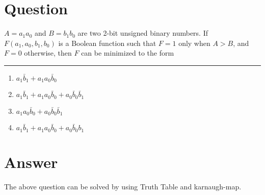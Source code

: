 \documentclass[journal,12pt,twocolumn]{IEEEtran}
\title{\mytitle}
\author{\myauthor\hspace{1em}\\\contact\\IITH\hspace{0.5em}-\hspace{0.6em}\mymodule}
\date{20-12-2022}
\begin{document}
%

\theoremstyle{definition}
\newtheorem{theorem}{Theorem}[section]
\newtheorem{problem}{Problem}
\newtheorem{proposition}{Proposition}[section]
\newtheorem{lemma}{Lemma}[section]
\newtheorem{corollary}[theorem]{Corollary}
\newtheorem{example}{Example}[section]
\newtheorem{definition}{Definition}[section]
\newcommand{\BEQA}{\begin{eqnarray}}
\newcommand{\EEQA}{\end{eqnarray}}
\newcommand{\define}{\stackrel{\triangle}{=}}


\vspace{3cm}
\maketitle
\tableofcontents



\section{\textbf{Question}}
$A=a_1a_0$ and $B=b_1b_0$ are two 2-bit unsigned binary numbers. If $F(a_1,a_0,b_1,b_0)$ is a Boolean function such that $F = 1$ only when $A>B$, and $F=0$ otherwise, then $F$ can be minimized to the form \rule{9mm}{0.4pt}
\begin{enumerate}[label=(\Alph*)]
	\item $a_1\bar b_1+a_1a_0\bar b_0$
	\item $a_1\bar b_1+a_1a_0\bar b_0+a_0\bar b_0\bar b_1$
	\item $a_1a_0\bar b_0 + a_0\bar b_0\bar b_1$
	\item $a_1\bar b_1+a_1a_0\bar b_0 + a_0\bar b_0b_1$  
\end{enumerate}

\section{\textbf{Answer}}
The above question can be solved by using Truth Table and karnaugh-map.\\
\end{document}
